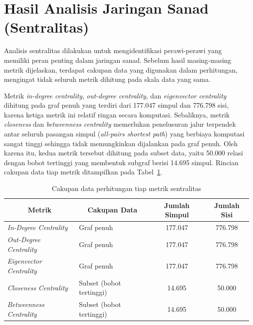 \section{Hasil Analisis Jaringan Sanad (Sentralitas)}
\label{subsec:analisis-sentralitas}
Analisis sentralitas dilakukan untuk mengidentifikasi perawi-perawi yang memiliki peran penting dalam jaringan sanad. Sebelum hasil masing-masing metrik dijelaskan, terdapat cakupan data yang digunakan dalam perhitungan, mengingat tidak seluruh metrik dihitung pada skala data yang sama.

\begin{sloppypar}
Metrik \textit{in-degree centrality}, \textit{out-degree centrality}, dan \textit{eigenvector centrality} dihitung pada graf penuh yang terdiri dari 177.047 simpul dan 776.798 sisi, karena ketiga metrik ini relatif ringan secara komputasi. Sebaliknya, metrik \textit{closeness} dan \textit{betweenness centrality} memerlukan penelusuran jalur terpendek antar seluruh pasangan simpul (\textit{all-pairs shortest path}) yang berbiaya komputasi sangat tinggi sehingga tidak memungkinkan dijalankan pada graf penuh. Oleh karena itu, kedua metrik tersebut dihitung pada subset data, yaitu 50.000 relasi dengan bobot tertinggi yang membentuk subgraf berisi 14.695 simpul. Rincian cakupan data tiap metrik ditampilkan pada Tabel~\ref{tab:cakupan-metrik}.
\end{sloppypar}

\begin{table}[H]
\centering
\caption{Cakupan data perhitungan tiap metrik sentralitas}
\label{tab:cakupan-metrik}
\renewcommand{\arraystretch}{1.3}
\begin{tabular}{|l|l|c|c|}
\hline
\multicolumn{1}{|c|}{\textbf{Metrik}} & \multicolumn{1}{c|}{\textbf{Cakupan Data}} & \multicolumn{1}{c|}{\textbf{Jumlah Simpul}} & \multicolumn{1}{c|}{\textbf{Jumlah Sisi}} \\
\hline
\textit{In-Degree Centrality} & Graf penuh & 177.047 & 776.798 \\
\hline
\textit{Out-Degree Centrality} & Graf penuh & 177.047 & 776.798 \\
\hline
\textit{Eigenvector Centrality} & Graf penuh & 177.047 & 776.798 \\
\hline
\textit{Closeness Centrality} & Subset (bobot tertinggi) & 14.695 & 50.000 \\
\hline
\textit{Betweenness Centrality} & Subset (bobot tertinggi) & 14.695 & 50.000 \\
\hline
\end{tabular}
\end{table}

